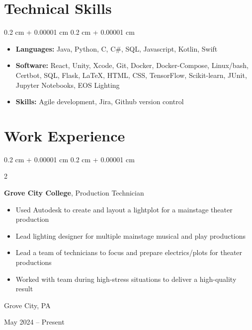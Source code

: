 \documentclass[10pt, letterpaper]{article}
\newenvironment{highlights}{
    \begin{itemize}[
        topsep=0.10 cm,
        parsep=0.10 cm,
        partopsep=0pt,
        itemsep=0pt,
        leftmargin=0.4 cm + 10pt
    ]
}{
    \end{itemize}
} %
\newenvironment{onecolentry}{
    \begin{adjustwidth}{
        0.2 cm + 0.00001 cm
    }{
        0.2 cm + 0.00001 cm
    }
}{
    \end{adjustwidth}
} %
\newenvironment{twocolentry}[2][]{
    \onecolentry
    \def\secondColumn{#2}
    \setcolumnwidth{\fill, 3.4 cm}
    \begin{paracol}{2}
}{
    \switchcolumn \raggedleft \secondColumn
    \end{paracol}
    \endonecolentry
} %
\begin{document}
    \section{Technical Skills}

        \begin{onecolentry}{
            
        }
            \begin{highlights}
                \item \textbf{Languages:} Java, Python, C, C\#, SQL, Javascript, Kotlin, Swift
                \item \textbf{Software:} React, Unity, Xcode, Git, Docker, Docker-Compose, Linux/bash, Certbot, SQL, Flask, LaTeX, HTML, CSS, TensorFlow, Scikit-learn, JUnit, Jupyter Notebooks, EOS Lighting
                \item \textbf{Skills:} Agile development, Jira, Github version control
            \end{highlights}
        \end{onecolentry}

    
    \section{Work Experience}
        
        \begin{twocolentry}{
            Grove City, PA

        May 2024 – Present
        }
            \textbf{Grove City College}, Production Technician
            \begin{highlights}
                \item Used Autodesk to create and layout a lightplot for a mainstage theater production
                \item Lead lighting designer for multiple mainstage musical and play productions
                \item Lead a team of technicians to focus and prepare electrics/plots for theater productions
                \item Worked with team during high-stress situations to deliver a high-quality result
            \end{highlights}
        \end{twocolentry}
\end{document}
